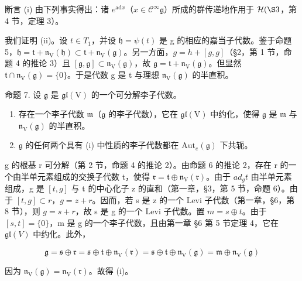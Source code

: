断言 (i) 由下列事实得出：诸 \(e^{\mathrm{ad}x}\)（\(x \in \mathcal{C}^{\infty}\mathfrak{g}\)）所成的群传递地作用于 \(\mathcal{H}(\S 3\)，第 4 节，定理 3）。

我们证明 (ii)。设 \(t \in T_{1}\)，并设 \(\mathfrak{h} = \psi(t)\) 是 g 的相应的嘉当子代数。鉴于命题 5，\(\mathfrak{h} = \mathfrak{t} + \mathfrak{n}_{\mathrm{V}}(\mathfrak{h}) \subset \mathfrak{t} + \mathfrak{n}_{\mathrm{V}}(\mathfrak{g})\)。另一方面，\(g = h + [g, g]\)（§2，第 1 节，命题 4 的推论 3）且 \([\mathfrak{g}, \mathfrak{g}] \subset \mathfrak{n}_{\mathrm{V}}(\mathfrak{g})\)，故 \(\mathfrak{g} = \mathfrak{t} + \mathfrak{n}_{\mathrm{V}}(\mathfrak{g})\)。但显然 \(\mathfrak{t} \cap \mathfrak{n}_{\mathrm{V}}(\mathfrak{g}) = \{0\}\)。于是代数 g 是 t 与理想 \(\mathfrak{n}_{\mathrm{V}}(\mathfrak{g})\) 的半直积。

命题 7. 设 \(\mathfrak{g}\) 是 \(\mathfrak{gl}(\mathrm{V})\) 的一个可分解李子代数。

\begin{enumerate}
\def\labelenumi{(\roman{enumi})}
\item
  存在一个李子代数 \(\mathfrak{m}\)（\(\mathfrak{g}\) 的李子代数），它在 \(\mathfrak{gl}(\mathrm{V})\) 中约化，使得 \(\mathfrak{g}\) 是 \(\mathfrak{m}\) 与 \(\mathfrak{n}_{\mathrm{V}}(\mathfrak{g})\) 的半直积。
\item
  \(\mathfrak{g}\) 的任何两个具有 (i) 中性质的李子代数都在 \(\mathrm{Aut}_e(\mathfrak{g})\) 下共轭。
\end{enumerate}

g 的根基 r 可分解（第 2 节，命题 4 的推论 2）。由命题 6 的推论 2，存在 r 的一个由半单元素组成的交换子代数 t，使得 \(\mathfrak{r} = \mathfrak{t} \oplus \mathfrak{n}_{\mathrm{V}}(\mathfrak{r})\)。由于 \(ad_{g}t\) 由半单元素组成，g 是 \([t, g]\) 与 t 的中心化子 z 的直和（第一章，§3，第 5 节，命题 6）。由于 \([t, g] \subset r\)，\(g = z + r\)。因而，若 s 是 z 的一个 Levi 子代数（第一章，§6，第 8 节），则 \(g = s + r\)，故 s 是 g 的一个 Levi 子代数。置 \(m = s \oplus t\)。由于 \([s, t] = \{0\}\)，m 是 g 的一个李子代数，且由第一章 §6 第 5 节定理 4，它在 \(\mathfrak{gl}(V)\) 中约化。此外，

\[
\mathfrak {g} = \mathfrak {s} \oplus \mathfrak {r} = \mathfrak {s} \oplus \mathfrak {t} \oplus \mathfrak {n} _ {\mathrm{V}} (\mathfrak {r}) = \mathfrak {s} \oplus \mathfrak {t} \oplus \mathfrak {n} _ {\mathrm{V}} (\mathfrak {g}) = \mathfrak {m} \oplus \mathfrak {n} _ {\mathrm{V}} (\mathfrak {g})
\]

因为 \(\mathfrak{n}_{\mathrm{V}}(\mathfrak{g}) = \mathfrak{n}_{\mathrm{V}}(\mathfrak{r})\)。故得 (i)。

